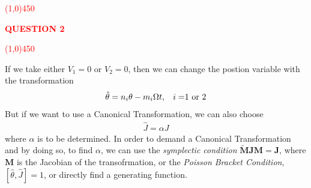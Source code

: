 %
%
%
\textcolor{red}{
\line(1,0){450}\\
\begin{center}
	\textbf{QUESTION 2}
\end{center}
\line(1,0){450}\\
}
%
%
%
%
%
If we take either $V_1=0$ or $V_2=0$, then we can change the postion variable with the transformation 
	\begin{align}\label{eq2.9}
		\hat{\theta} = n_i\theta-m_i\Omega t, \text{\hspace{.3cm}$i=$1 or 2}
	\end{align}
But if we want to use a Canonical Transformation, we can also choose 
	\begin{align}\label{eq2.10}
		\hat{J} = \alpha J 
	\end{align}
where $\alpha$ is to be determined. In order to demand a Canonical Transformation and by doing so, to find $\alpha$, we can use the \textit{symplectic condition} $\tilde{\bm{M}}\bm{J}\bm{M} = \bm{J}$, where $\bm{M}$ is the Jacobian of the transofrmation, or the \textit{Poisson Bracket Condition}, $[\hat{\theta},\hat{J}]=1$, or directly find a generating function. 

